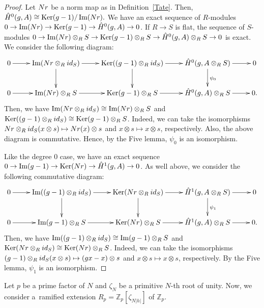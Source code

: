 \documentclass[11pt]{article}
\numberwithin{equation}{section}
\numberwithin{equation}{section}
\begin{document}
\begin{proof}Let ${\rm Nr}$ be a norm map as in Definition~\ref{Tate}. Then, $\hat{H}^0(g,A)\cong \operatorname{Ker}(g-1)/\operatorname{Im}({\rm Nr}).$ We have an exact sequence of $R$-modules $0\rightarrow \operatorname{Im}({\rm Nr})\rightarrow \operatorname{Ker}(g-1)\rightarrow \hat{H}^0(g,A)\rightarrow 0$. If $R \rightarrow S$ is flat, the sequence of $S$-modules $0\rightarrow \operatorname{Im}({\rm Nr})\otimes_R S\rightarrow \operatorname{Ker}(g-1)\otimes_R S\rightarrow \hat{H}^0(g,A)\otimes_R S\rightarrow 0$ is exact. We consider the following diagram:
\[ \xymatrix{
0\ar[r] & \operatorname{Im}({\rm Nr}\otimes_R {\rm id}_S)\ar[d] \ar[r] & \operatorname{Ker}((g-1)\otimes_R {\rm id}_S)\ar[d] \ar[r] & \hat{H}^0(g,A\otimes_R S)\ar[d]^{\psi_0} \ar[r] & 0 \\
 0\ar[r] & \operatorname{Im}({\rm Nr})\otimes_R S\ar[r] & \operatorname{Ker}(g-1)\otimes_R S\ar[r] & \hat{H}^0(g,A)\otimes_R S\ar[r] & 0.
 }
\]
Then, we have $\operatorname{Im}({\rm Nr}\otimes_R {\rm id}_S)\cong \operatorname{Im}({\rm Nr})\otimes_R S$ and $\operatorname{Ker}((g-1)\otimes_R {\rm id}_S)\cong \operatorname{Ker}(g-1)\otimes_R S$. Indeed, we can take the isomorphisms ${\rm Nr}\otimes_R {\rm id}_S(x\otimes s) \mapsto {\rm Nr}(x)\otimes s$ and $x\otimes s \mapsto x\otimes s$, respectively.
Also, the above diagram is commutative. Hence, by the Five lemma, $\psi_0$ is an isomorphism.

Like the degree 0 case, we have an exact sequence $0\rightarrow \operatorname{Im}(g-1)\rightarrow \operatorname{Ker}({\rm Nr})\rightarrow \hat{H}^1(g,A)\rightarrow 0$. As well above, we consider the following commutative diagram:
\[ \xymatrix{
0\ar[r] & \operatorname{Im}((g-1)\otimes_R {\rm id}_S)\ar[d] \ar[r] & \operatorname{Ker}({\rm Nr}\otimes_R {\rm id}_S)\ar[d] \ar[r] & \hat{H}^1(g,A\otimes_R S)\ar[d]^{\psi_1} \ar[r] & 0 \\
 0\ar[r] & \operatorname{Im}(g-1)\otimes_R S\ar[r] & \operatorname{Ker}({\rm Nr})\otimes_R S\ar[r] & \hat{H}^1(g,A)\otimes_R S\ar[r] & 0.
 }
\]
Then, we have $\operatorname{Im}((g-1)\otimes_R {\rm id}_S)\cong \operatorname{Im}(g-1)\otimes_R S$ and $\operatorname{Ker}({\rm Nr}\otimes_R {\rm id}_S)\cong \operatorname{Ker}({\rm Nr})\otimes_R S$. Indeed, we can take the isomorphisms $(g-1)\otimes_R {\rm id}_S(x\otimes s) \mapsto (gx-x)\otimes s$ and $x\otimes s \mapsto x\otimes s$, respectively.
By the Five lemma, $\psi_1$ is an isomorphism.
\end{proof}

\setcounter{Theorem}{4}
Let $p$ be a prime factor of $N$ and $\zeta_N$ be a primitive $N$-th root of unity. Now, we consider a~ramified extension $R_p=\mathbb{Z}_p[\zeta_{N|h|}]$ of $\mathbb{Z}_p$.
\end{document}
